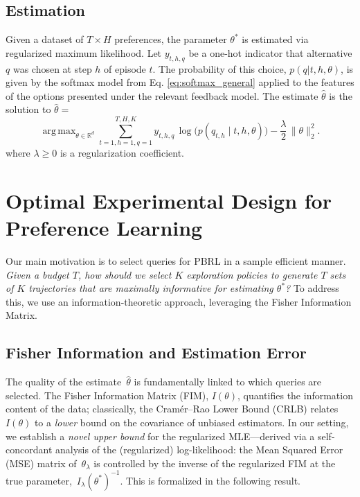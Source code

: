 \documentclass{article}
\DeclareMathOperator*{\argmax}{arg\,max}
\begin{document}
\vspace{-0.2cm}\subsection{Estimation}
Given a dataset of $T \times H$ preferences, the parameter $\theta^*$ is estimated via regularized maximum likelihood. Let $y_{t,h,q}$ be a one-hot indicator that alternative $q$ was chosen at step $h$ of episode $t$. The probability of this choice, $p(q|t,h, \theta)$, is given by the softmax model from Eq. \ref{eq:softmax_general} applied to the features of the options presented under the relevant feedback model. The estimate $\hat{\theta}$ is the solution to $\hat{\theta} =$
\begin{equation}
 \argmax_{\theta \in \mathbb{R}^d} \sum_{t=1,h=1,q=1}^{T,H,K}  y_{t,h,q} \, \log\big(p(q_{t,h}\mid t,h, \theta)\big) - \frac{\lambda}{2} \, \|\theta\|_2^2.
\end{equation}
where $\lambda \ge 0$ is a regularization coefficient.

\vspace{-0.2cm}\section{Optimal Experimental Design for Preference Learning}\label{sec:exp_design}

\vspace{-0.1cm} Our main motivation is to select queries for PBRL in a sample efficient manner. \emph{Given a budget $T$, how should we select $K$ exploration policies to generate $T$ sets of $K$ trajectories that are maximally informative for estimating $\theta^*$?} To address this, we use an information-theoretic approach, leveraging the Fisher Information Matrix.

\vspace{-0.2cm}\subsection{Fisher Information and Estimation Error}
\vspace{-0.2cm}The quality of the estimate~$\hat{\theta}$ is fundamentally linked to which queries are selected. The Fisher Information Matrix (FIM), $I(\theta)$, quantifies the information content of the data; classically, the Cram\'er--Rao Lower Bound (CRLB) relates $I(\theta)$ to a \emph{lower} bound on the covariance of unbiased estimators. In our setting, we establish a \emph{novel upper bound} for the regularized MLE---derived via a self-concordant analysis of the (regularized) log-likelihood: the Mean Squared Error (MSE) matrix of~$\theta_\lambda$ is controlled by the inverse of the regularized FIM at the true parameter,~$I_\lambda(\theta^*)^{-1}$. This is formalized in the following result.
\end{document}
